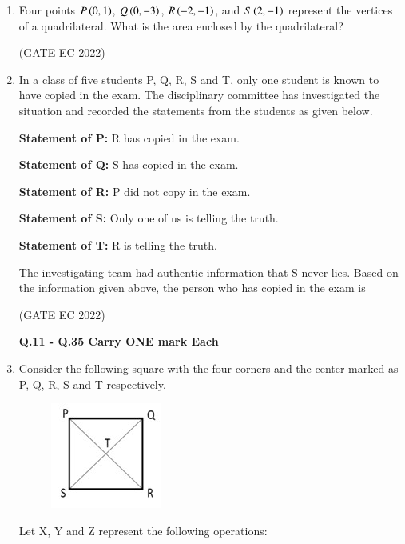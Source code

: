 \documentclass[journal,12pt,onecolumn]{IEEEtran}
\theoremstyle{remark}
\begin{document}
\begin{enumerate}
    \item Four points $P\left(0, 1\right)$, $Q\left(0, -3\right)$, $R\left(-2, -1\right)$, and $S\left(2, -1\right)$ represent the vertices of a quadrilateral.
    What is the area enclosed by the quadrilateral?

    \hfill{(GATE EC 2022)}
    \begin{enumerate}
    \end{enumerate}

    \item In a class of five students P, Q, R, S and T, only one student is known to have copied in the exam. The disciplinary committee has investigated the situation and recorded the statements from the students as given below.
    
    \textbf{Statement of P:} R has copied in the exam.
    
    \textbf{Statement of Q:} S has copied in the exam.
    
    \textbf{Statement of R:} P did not copy in the exam.
    
    \textbf{Statement of S:} Only one of us is telling the truth.
    
    \textbf{Statement of T:} R is telling the truth.
    
    The investigating team had authentic information that S never lies.
    Based on the information given above, the person who has copied in the exam is

    \hfill{(GATE EC 2022)}
    \begin{enumerate}
    \end{enumerate}

\textbf{Q.11 - Q.35 Carry ONE mark Each}

    \item Consider the following square with the four corners and the center marked as P, Q, R, S and T respectively.
    \begin{figure}[H]
        \centering
        \includegraphics[width=0.25\columnwidth]{figs/m3.jpg}
        \caption*{}
        \label{fig:m3}
    \end{figure}
    Let X, Y and Z represent the following operations:
    

\end{enumerate}
\end{document}
